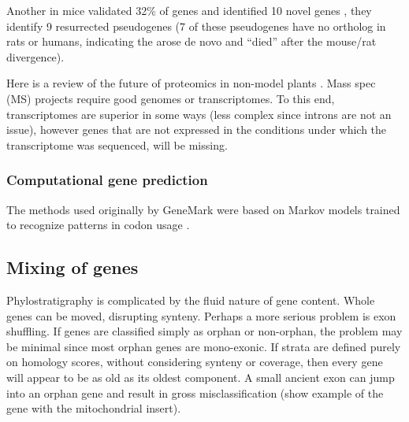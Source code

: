 
  Another in mice validated 32\% of genes and identified 10 novel genes
  \cite{brosch_shotgun_2011}, they identify 9 resurrected pseudogenes (7 of
  these pseudogenes have no ortholog in rats or humans, indicating the arose de
  novo and ``died'' after the mouse/rat divergence).

  Here is a review of the future of proteomics in non-model plants
  \cite{champagne_proteomics_2013}. Mass spec (MS) projects require good
  genomes or transcriptomes. To this end, transcriptomes are superior in some
  ways (less complex since introns are not an issue), however genes that are
  not expressed in the conditions under which the transcriptome was sequenced,
  will be missing.

\subsubsection{Computational gene prediction}

The methods used originally by GeneMark were based on Markov models trained to
recognize patterns in codon usage \cite{besemer_heuristic_1999}.


\subsection{Mixing of genes} Phylostratigraphy is complicated by the fluid
nature of gene content. Whole genes can be moved, disrupting synteny.
Perhaps a more serious problem is exon shuffling. If genes are classified
simply as orphan or non-orphan, the problem may be minimal since most
orphan genes are mono-exonic. If strata are defined purely on homology
scores, without considering synteny or coverage, then every gene will
appear to be as old as its oldest component. A small ancient exon can jump
into an orphan gene and result in gross misclassification (show example of
the gene with the mitochondrial insert).

